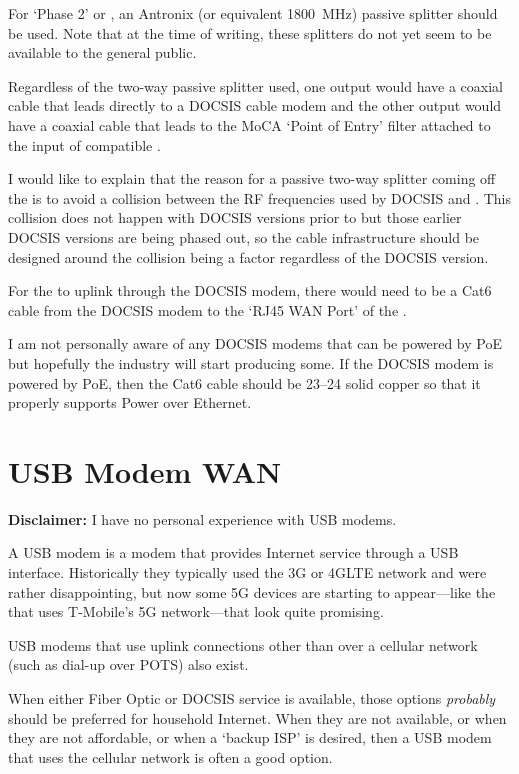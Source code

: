 For  `Phase 2' or , an Antronix
 (or equivalent \qty{1800}{\mega\hertz})
passive splitter should be used. Note that at the time of writing, these splitters do not yet seem to be
available to the general public.

Regardless of the two-way passive splitter used, one output would have a coaxial cable that leads directly
to a DOCSIS cable modem and the other output would have a coaxial cable that leads to the MoCA `Point of
Entry' filter attached to the input of \xdband{} compatible .

I would like to explain that the reason for a passive two-way splitter coming off the  is to avoid a collision between the RF frequencies used by DOCSIS and \xdband{}. This
collision does not happen with DOCSIS versions prior to  but those earlier DOCSIS versions are
being phased out, so the cable infrastructure should be designed around the collision being a factor regardless
of the DOCSIS version.

For the  to uplink through the DOCSIS modem, there would need to be a Cat6 cable from the
DOCSIS modem to the `RJ45 WAN Port' of the .

I am not personally aware of any DOCSIS modems that can be powered by PoE but hopefully the industry will
start producing some. If the DOCSIS modem is powered by PoE, then the Cat6 cable should be \qtyrange{23}{24}{\awg}
solid copper so that it properly supports Power over Ethernet.

\section{USB Modem WAN}

\textbf{Disclaimer:} I have no personal experience with USB modems.

A USB modem is a modem that provides Internet service through a USB interface. Historically they typically
used the 3G or 4GLTE network and were rather disappointing, but now some 5G devices are starting to
appear---like the  that uses T-Mobile's
5G network---that look quite promising.

USB modems that use uplink connections other than over a cellular network (such as dial-up over POTS) also
exist.

When either Fiber Optic or DOCSIS service is available, those options \emph{probably} should be preferred
for household Internet. When they are not available, or when they are not affordable, or when a `backup ISP'
is desired, then a USB modem that uses the cellular network is often a good option.

